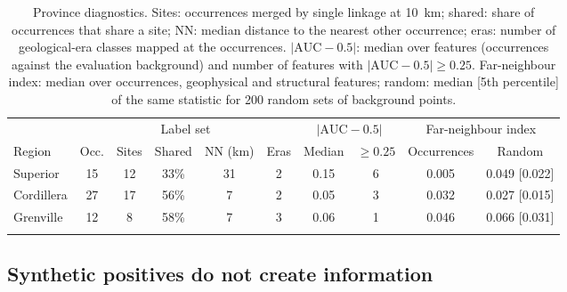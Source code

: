 \documentclass[pdflatex,sn-apa]{sn-jnl}
\begin{document}
\begin{table}[t]
\caption{Province diagnostics. Sites: occurrences merged by single linkage at 10~km; shared: share of occurrences that share a site; NN: median distance to the nearest other occurrence; eras: number of geological-era classes mapped at the occurrences. $|\mathrm{AUC}-0.5|$: median over features (occurrences against the evaluation background) and number of features with $|\mathrm{AUC}-0.5| \geq 0.25$. Far-neighbour index: median over occurrences, geophysical and structural features; random: median [5th percentile] of the same statistic for 200 random sets of background points.}\label{tab:region-diag}
\scriptsize
\setlength{\tabcolsep}{2.5pt}
\begin{tabular*}{\textwidth}{@{\extracolsep\fill}lccccccccc}
\toprule
 & \multicolumn{5}{c}{Label set} & \multicolumn{2}{c}{$|\mathrm{AUC}-0.5|$} & \multicolumn{2}{c}{Far-neighbour index} \\
\cmidrule(lr){2-6}\cmidrule(lr){7-8}\cmidrule(lr){9-10}
Region & Occ. & Sites & Shared & NN (km) & Eras & Median & $\geq 0.25$ & Occurrences & Random \\
\midrule
Superior & 15 & 12 & 33\% & 31 & 2 & 0.15 & 6 & 0.005 & 0.049 [0.022] \\
Cordillera & 27 & 17 & 56\% & 7 & 2 & 0.05 & 3 & 0.032 & 0.027 [0.015] \\
Grenville & 12 & 8 & 58\% & 7 & 3 & 0.06 & 1 & 0.046 & 0.066 [0.031] \\
\botrule
\end{tabular*}
\end{table}

\subsection{Synthetic positives do not create information}\label{sec:disc-gan}
\end{document}
